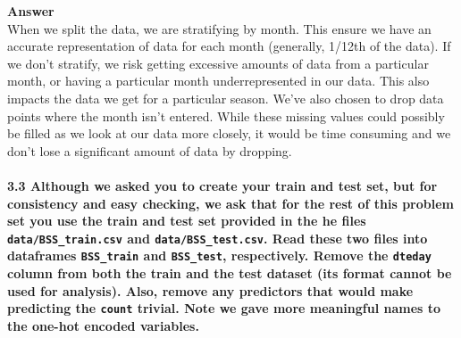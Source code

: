 \documentclass[11pt]{article}
\begin{document}
    \textbf{Answer}\\
When we split the data, we are stratifying by month. This ensure we have
an accurate representation of data for each month (generally, 1/12th of
the data). If we don't stratify, we risk getting excessive amounts of
data from a particular month, or having a particular month
underrepresented in our data. This also impacts the data we get for a
particular season. We've also chosen to drop data points where the month
isn't entered. While these missing values could possibly be filled as we
look at our data more closely, it would be time consuming and we don't
lose a significant amount of data by dropping.

    \paragraph{\texorpdfstring{\textbf{3.3} Although we asked you to create
your train and test set, but for consistency and easy checking, we ask
that for the rest of this problem set you use the train and test set
provided in the he files \texttt{data/BSS\_train.csv} and
\texttt{data/BSS\_test.csv}. Read these two files into dataframes
\texttt{BSS\_train} and \texttt{BSS\_test}, respectively. Remove the
\texttt{dteday} column from both the train and the test dataset (its
format cannot be used for analysis). Also, remove any predictors that
would make predicting the \texttt{count} trivial. Note we gave more
meaningful names to the one-hot encoded
variables.}{3.3 Although we asked you to create your train and test set, but for consistency and easy checking, we ask that for the rest of this problem set you use the train and test set provided in the he files data/BSS\_train.csv and data/BSS\_test.csv. Read these two files into dataframes BSS\_train and BSS\_test, respectively. Remove the dteday column from both the train and the test dataset (its format cannot be used for analysis). Also, remove any predictors that would make predicting the count trivial. Note we gave more meaningful names to the one-hot encoded variables.}}\label{although-we-asked-you-to-create-your-train-and-test-set-but-for-consistency-and-easy-checking-we-ask-that-for-the-rest-of-this-problem-set-you-use-the-train-and-test-set-provided-in-the-he-files-databss_train.csv-and-databss_test.csv.-read-these-two-files-into-dataframes-bss_train-and-bss_test-respectively.-remove-the-dteday-column-from-both-the-train-and-the-test-dataset-its-format-cannot-be-used-for-analysis.-also-remove-any-predictors-that-would-make-predicting-the-count-trivial.-note-we-gave-more-meaningful-names-to-the-one-hot-encoded-variables.}
\end{document}
